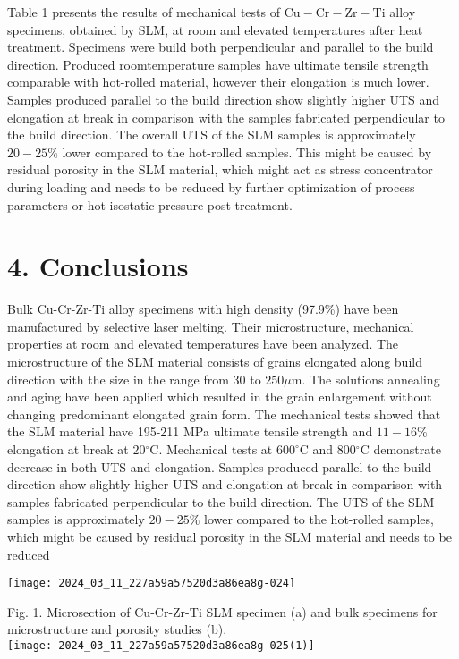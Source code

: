 \documentclass[10pt]{article}
\begin{document}
Table 1 presents the results of mechanical tests of $\mathrm{Cu}-\mathrm{Cr}-\mathrm{Zr}-\mathrm{Ti}$ alloy specimens, obtained by SLM, at room and elevated temperatures after heat treatment. Specimens were build both perpendicular and parallel to the build direction. Produced roomtemperature samples have ultimate tensile strength comparable with hot-rolled material, however their elongation is much lower. Samples produced parallel to the build direction show slightly higher UTS and elongation at break in comparison with the samples fabricated perpendicular to the build direction. The overall UTS of the SLM samples is approximately $20-25 \%$ lower compared to the hot-rolled samples. This might be caused by residual porosity in the SLM material, which might act as stress concentrator during loading and needs to be reduced by further optimization of process parameters or hot isostatic pressure post-treatment.

\section*{4. Conclusions}
Bulk Cu-Cr-Zr-Ti alloy specimens with high density (97.9\%) have been manufactured by selective laser melting. Their microstructure, mechanical properties at room and elevated temperatures have been analyzed. The microstructure of the SLM material consists of grains elongated along build direction with the size in the range from 30 to $250 \mu \mathrm{m}$. The solutions annealing and aging have been applied which resulted in the grain enlargement without changing predominant elongated grain form. The mechanical tests showed that the SLM material have 195-211 MPa ultimate tensile strength and $11-16 \%$ elongation at break at $20{ }^{\circ} \mathrm{C}$. Mechanical tests at $600^{\circ} \mathrm{C}$ and $800{ }^{\circ} \mathrm{C}$ demonstrate decrease in both UTS and elongation. Samples produced parallel to the build direction show slightly higher UTS and elongation at break in comparison with samples fabricated perpendicular to the build direction. The UTS of the SLM samples is approximately $20-25 \%$ lower compared to the hot-rolled samples, which might be caused by residual porosity in the SLM material and needs to be reduced

\begin{center}
\texttt{[image: 2024\_03\_11\_227a59a57520d3a86ea8g-024]}
\end{center}

Fig. 1. Microsection of Cu-Cr-Zr-Ti SLM specimen (a) and bulk specimens for microstructure and porosity studies (b).\\
\texttt{[image: 2024\_03\_11\_227a59a57520d3a86ea8g-025(1)]}
\end{document}
